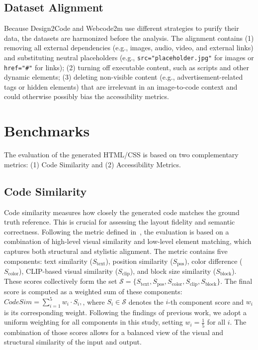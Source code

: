 \subsection{Dataset Alignment}
Because Design2Code and Webcode2m use different strategies to purify 
their data, the datasets are harmonized before the analysis. 
The alignment contains (1) removing all external dependencies (e.g., images, audio, 
video, and external links) and substituting neutral placeholders (e.g., \texttt{src="placeholder.jpg"}
for images or \texttt{href="\#"} for links); (2) turning off executable content, 
such as scripts and other dynamic elements; (3) deleting non-visible content (e.g.,
advertisement-related tags or hidden elements) that are irrelevant in 
an image-to-code context and could otherwise possibly bias 
the accessibility metrics.



\section{Benchmarks}
The evaluation of the generated HTML/CSS is based on two complementary 
metrics: (1) Code Similarity and (2) Accessibility Metrics.

\subsection{Code Similarity}
Code similarity measures how closely the generated code matches the ground
truth reference. This is crucial for assessing the layout fidelity and 
semantic correctness. Following the metric defined in~\cite{si2024design2code}, 
the evaluation is based on a combination of high-level visual 
similarity and low-level element matching, which captures both 
structural and stylistic alignment. 
The metric contains five components:
text similarity (\(S_{\text{text}}\)), position similarity 
(\(S_{\text{pos}}\)), color difference (\(S_{\text{color}}\)), 
CLIP-based visual similarity (\(S_{\text{clip}}\)), 
and block size similarity (\(S_{\text{block}}\)). 
These scores collectively form the set 
\(\mathcal{S} = \{S_{\text{text}}, S_{\text{pos}}, S_{\text{color}}, S_{\text{clip}}, S_{\text{block}}\}\). 
The final score is computed as a weighted sum of these components:
\(
\textit{CodeSim} = \sum_{i=1}^{5} w_i \cdot S_i,
\),
where \(S_i \in \mathcal{S}\) denotes the \(i\)-th component score and \(w_i\) is its corresponding weight.
Following the findings of previous work, we adopt a uniform weighting for all components in this study, setting \(w_i = \frac{1}{5}\) for all \(i\).
The combination of those scores allows for a balanced view of the visual and 
structural similarity of the input and output.


